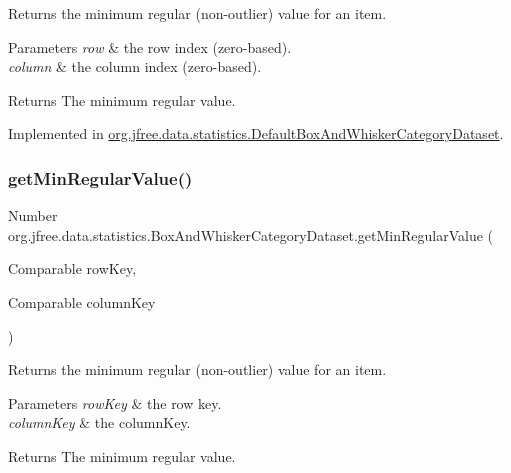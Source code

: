 Returns the minimum regular (non-\/outlier) value for an item.


\begin{DoxyParams}{Parameters}
{\em row} & the row index (zero-\/based). \\
\hline
{\em column} & the column index (zero-\/based).\\
\hline
\end{DoxyParams}
\begin{DoxyReturn}{Returns}
The minimum regular value. 
\end{DoxyReturn}


Implemented in \mbox{\hyperlink{classorg_1_1jfree_1_1data_1_1statistics_1_1_default_box_and_whisker_category_dataset_ae66a77a0c419365ccc8c3696c05d00e3}{org.\+jfree.\+data.\+statistics.\+Default\+Box\+And\+Whisker\+Category\+Dataset}}.

\mbox{\label{interfaceorg_1_1jfree_1_1data_1_1statistics_1_1_box_and_whisker_category_dataset_afadbc2ab28bb51815ab80b002177894e}} 
\subsubsection{\texorpdfstring{get\+Min\+Regular\+Value()}{getMinRegularValue()}\hspace{0.1cm}{\footnotesize\ttfamily [2/2]}}
{\footnotesize\ttfamily Number org.\+jfree.\+data.\+statistics.\+Box\+And\+Whisker\+Category\+Dataset.\+get\+Min\+Regular\+Value (\begin{DoxyParamCaption}\item[{Comparable}]{row\+Key,  }\item[{Comparable}]{column\+Key }\end{DoxyParamCaption})}

Returns the minimum regular (non-\/outlier) value for an item.


\begin{DoxyParams}{Parameters}
{\em row\+Key} & the row key. \\
\hline
{\em column\+Key} & the column\+Key.\\
\hline
\end{DoxyParams}
\begin{DoxyReturn}{Returns}
The minimum regular value. 
\end{DoxyReturn}


